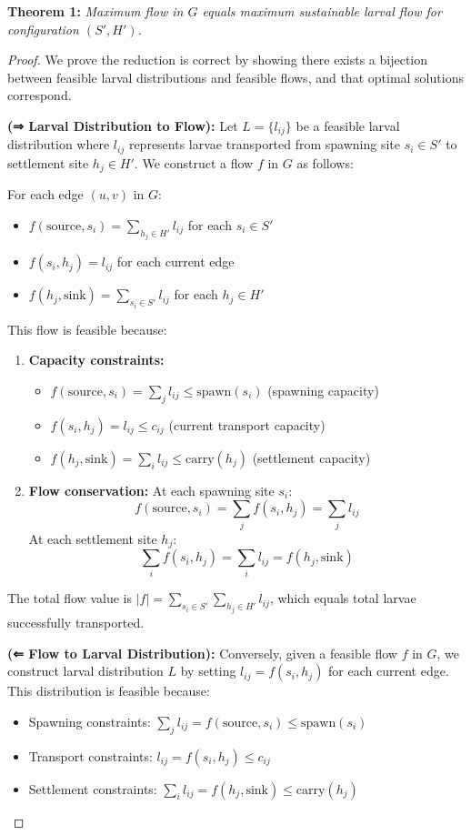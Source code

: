 \documentclass[sigconf,nonacm]{acmart}
\begin{document}
\textbf{Theorem 1:} \textit{Maximum flow in $G$ equals maximum sustainable larval flow for configuration $(S', H')$.}

\begin{proof}
We prove the reduction is correct by showing there exists a bijection between feasible larval distributions and feasible flows, and that optimal solutions correspond.

\textbf{(⇒ Larval Distribution to Flow):} Let $L = \{l_{ij}\}$ be a feasible larval distribution where $l_{ij}$ represents larvae transported from spawning site $s_i \in S'$ to settlement site $h_j \in H'$. We construct a flow $f$ in $G$ as follows:

For each edge $(u,v)$ in $G$:
\begin{itemize}
    \item $f(\text{source}, s_i) = \sum_{h_j \in H'} l_{ij}$ for each $s_i \in S'$
    \item $f(s_i, h_j) = l_{ij}$ for each current edge
    \item $f(h_j, \text{sink}) = \sum_{s_i \in S'} l_{ij}$ for each $h_j \in H'$
\end{itemize}

This flow is feasible because:
\begin{enumerate}
    \item \textbf{Capacity constraints:}
        \begin{itemize}
            \item $f(\text{source}, s_i) = \sum_j l_{ij} \leq \text{spawn}(s_i)$ (spawning capacity)
            \item $f(s_i, h_j) = l_{ij} \leq c_{ij}$ (current transport capacity)
            \item $f(h_j, \text{sink}) = \sum_i l_{ij} \leq \text{carry}(h_j)$ (settlement capacity)
        \end{itemize}
    \item \textbf{Flow conservation:} At each spawning site $s_i$:
        \[f(\text{source}, s_i) = \sum_j f(s_i, h_j) = \sum_j l_{ij}\]
        At each settlement site $h_j$:
        \[\sum_i f(s_i, h_j) = \sum_i l_{ij} = f(h_j, \text{sink})\]
\end{enumerate}

The total flow value is $|f| = \sum_{s_i \in S'} \sum_{h_j \in H'} l_{ij}$, which equals total larvae successfully transported.

\textbf{(⇐ Flow to Larval Distribution):} Conversely, given a feasible flow $f$ in $G$, we construct larval distribution $L$ by setting $l_{ij} = f(s_i, h_j)$ for each current edge. This distribution is feasible because:
\begin{itemize}
    \item Spawning constraints: $\sum_j l_{ij} = f(\text{source}, s_i) \leq \text{spawn}(s_i)$
    \item Transport constraints: $l_{ij} = f(s_i, h_j) \leq c_{ij}$
    \item Settlement constraints: $\sum_i l_{ij} = f(h_j, \text{sink}) \leq \text{carry}(h_j)$
\end{itemize}


\end{proof}
\end{document}
